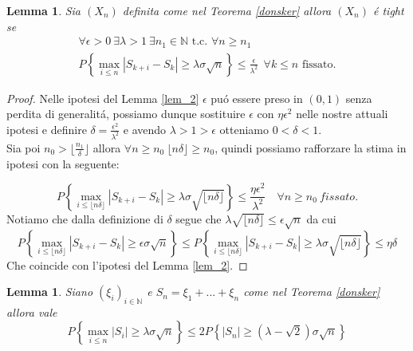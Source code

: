 \documentclass[11pt, twoside]{report}
\theoremstyle{definition}
\theoremstyle{plain}
\newtheorem{lemma}[teo]{Lemma}
\theoremstyle{remark}
\numberwithin{equation}{chapter}
\begin{document}
\begin{lemma} \label{lem_3} Sia $(X_n)$ definita come nel Teorema \ref{donsker} allora $(X_n)$ \'e tight se 
\begin{gather}
\forall \epsilon>0\  \exists \lambda>1 \ \exists n_1 \in \mathbb N \text{ t.c. }  \forall n\geq n_1  \nonumber \\
P\left\{\max\limits_{i\leq n}|S_{k+i} -S_{k}|	\geq \lambda \sigma \sqrt n\right\} \leq \frac{\epsilon}{\lambda^2} \ \  \forall k\leq n \text{ fissato}.
\end{gather}
\end{lemma}
\begin{proof}
Nelle ipotesi del Lemma \ref{lem_2} $\epsilon$ pu\'o essere preso in $(0,1)$ senza perdita di generalit\'a, possiamo dunque sostituire $\epsilon$ con $\eta \epsilon^2$ nelle nostre attuali ipotesi e definire $\delta = \frac{\epsilon^2}{\lambda^2}$ e avendo $\lambda>1>\epsilon$ otteniamo $0<\delta <1$. \\
Sia poi $n_0> \lfloor \frac{n_1}{\delta} \rfloor$ allora $\forall n \geq n_0 \ \lfloor n \delta \rfloor \geq n_0$, quindi possiamo rafforzare la stima in ipotesi con la seguente:

$$P\left\{\max\limits_{i\leq \lfloor n \delta \rfloor}|S_{k+i} -S_{k}| \geq \lambda \sigma \sqrt {\lfloor n \delta \rfloor}\right\} \leq \frac{\eta \epsilon^2}{\lambda^2} \quad  \forall n \geq n_0 \ fissato.$$
Notiamo che dalla definizione di $\delta$ segue che $\lambda \sqrt{\lfloor n \delta \rfloor}\leq \epsilon \sqrt n$ da cui 
$$P\left\{\max\limits_{i\leq \lfloor n \delta \rfloor}|S_{k+i} -S_{k}| \geq \epsilon \sigma \sqrt n\right\} \leq P\left\{\max\limits_{i\leq \lfloor n \delta \rfloor}|S_{k+i} -S_{k}| \geq \lambda \sigma \sqrt {\lfloor n \delta \rfloor}\right\} \leq \eta \delta$$
Che coincide con l'ipotesi del Lemma \ref{lem_2}.
\end{proof}

\begin{lemma} \label{lem_4} Siano $(\xi_i)_{i \in \mathbb N}$ e $S_n=\xi_1+ ... +\xi_n$ come nel Teorema \ref{donsker} allora vale
\begin{equation} \label{lem_4_eq}
P\left\{\max\limits_{i\leq n}|S_i| \geq \lambda \sigma \sqrt n\right\} \leq 2 P\left\{ |S_n| \geq (\lambda - \sqrt 2) \sigma \sqrt n \right\}
\end{equation}
\end{lemma}
\end{document}
